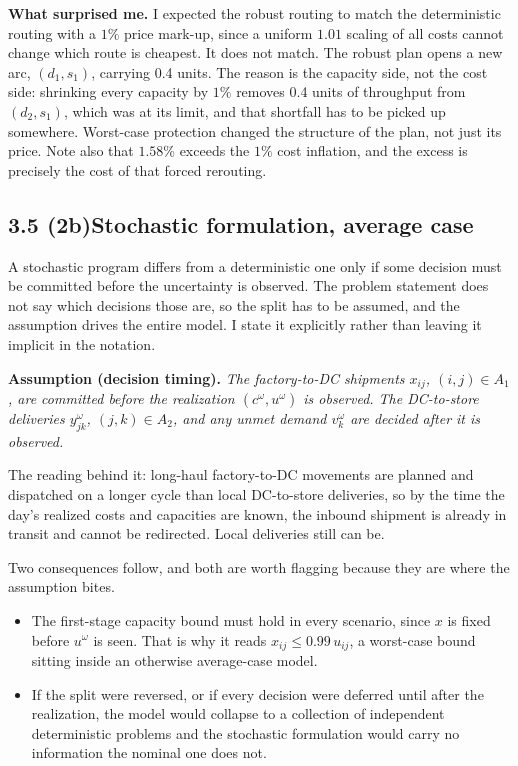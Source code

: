 \documentclass[11pt]{article}
\begin{document}
\textbf{What surprised me.}\quad
I expected the robust routing to match the deterministic routing with a
$1\%$ price mark-up, since a uniform $1.01$ scaling of all costs cannot
change which route is cheapest. It does not match. The robust plan opens
a new arc, $(d_1, s_1)$, carrying 0.4 units. The reason is the capacity
side, not the cost side: shrinking every capacity by $1\%$ removes 0.4
units of throughput from $(d_2, s_1)$, which was at its limit, and that
shortfall has to be picked up somewhere. Worst-case protection changed
the structure of the plan, not just its price. Note also that $1.58\%$
exceeds the $1\%$ cost inflation, and the excess is precisely the cost
of that forced rerouting.

\subsection*{3.5 (2b)\quad Stochastic formulation, average case}

A stochastic program differs from a deterministic one only if some
decision must be committed before the uncertainty is observed. The
problem statement does not say which decisions those are, so the split
has to be assumed, and the assumption drives the entire model. I state
it explicitly rather than leaving it implicit in the notation.

\textbf{Assumption (decision timing).}\quad
\emph{The factory-to-DC shipments $x_{ij}$, $(i,j) \in A_1$, are
committed before the realization $(c^{\omega}, u^{\omega})$ is observed.
The DC-to-store deliveries $y^{\omega}_{jk}$, $(j,k) \in A_2$, and any
unmet demand $v^{\omega}_{k}$ are decided after it is observed.}

The reading behind it: long-haul factory-to-DC movements are planned and
dispatched on a longer cycle than local DC-to-store deliveries, so by the
time the day's realized costs and capacities are known, the inbound
shipment is already in transit and cannot be redirected. Local
deliveries still can be.

Two consequences follow, and both are worth flagging because they are
where the assumption bites.

\begin{itemize}
\item The first-stage capacity bound must hold in every scenario, since
      $x$ is fixed before $u^{\omega}$ is seen. That is why it reads
      $x_{ij} \le 0.99\, u_{ij}$, a worst-case bound sitting inside an
      otherwise average-case model.
\item If the split were reversed, or if every decision were deferred
      until after the realization, the model would collapse to a
      collection of independent deterministic problems and the stochastic
      formulation would carry no information the nominal one does not.
\end{itemize}
\end{document}
